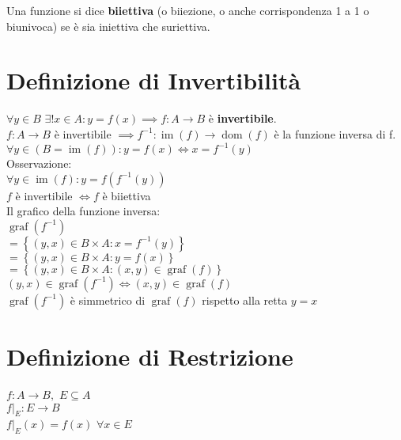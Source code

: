\documentclass[a4paper, twoside, italian, 11pt]{book}
\newcommand{\braces}[1] {\left \{ #1 \right \}}
\DeclareMathOperator{\dom}{dom}
\DeclareMathOperator{\im}{im}
\DeclareMathOperator{\graf}{graf}
\begin{document}
\noindent
Una funzione si dice \textbf{biiettiva} (o biiezione, o anche corrispondenza 1 a 1 o biunivoca) se è sia iniettiva che suriettiva.



\section{Definizione di Invertibilità}

\noindent
$\forall y \in B$ $\exists! x \in A : y = f(x) \implies f : A \rightarrow B$ è \textbf{invertibile}. \\

\noindent
$f : A \rightarrow B$ è invertibile $\implies f^{-1} : \im(f) \rightarrow \dom(f)$ è la funzione inversa di f. \\

\noindent
$\forall y \in (B = \im(f)) : y = f(x) \iff x = f^{-1}(y)$ \\

\noindent
Osservazione: \\

\noindent
$\forall y \in \im(f) : y = f(f^{-1}(y))$ \\

\noindent
$f$ è invertibile $\iff f$ è biiettiva \\

\noindent
Il grafico della funzione inversa: \\
$\graf(f^{-1})$ \\
$= \braces{(y, x) \in B \times A : x = f^{-1}(y)}$ \\
$= \braces{(y, x) \in B \times A : y = f(x)}$ \\
$= \braces{(y, x) \in B \times A : (x, y) \in \graf(f)}$ \\

\noindent
$(y, x) \in \graf(f^{-1}) \iff (x, y) \in \graf(f)$ \\

\noindent
$\graf(f^{-1})$ è simmetrico di $\graf(f)$ rispetto alla retta $y = x$



\section{Definizione di Restrizione}

\noindent
$f : A \rightarrow B,$ $E \subseteq A$ \\

\noindent
$f|_E : E \rightarrow B$ \\
$f|_E(x) = f(x)$ $\forall x \in E$ \\
\end{document}
